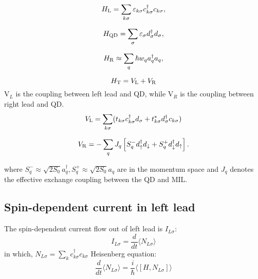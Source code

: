 \documentclass[11pt,a4paper]{book}
\begin{document}
\begin{equation}
H_{\rm{L}} = \sum_{k\sigma} \varepsilon_{k\sigma} c_{k \sigma}^{\dagger} c_{k \sigma},
\end{equation}

\begin{equation}
H_{\rm{QD}} = \sum_{\sigma}\varepsilon_{\sigma} d_{\sigma}^{\dagger} d_{\sigma},
\end{equation}

\begin{equation}
H_{\rm{R}} \approx \sum_{q} \hbar w_{q} a_{q}^{\dagger} a_{q},
\end{equation}

\begin{equation}
H_{\rm{T}} = V_{\rm{L}} + V_{\rm{R}}
\end{equation}
V$_{L}$ is the coupling between left lead and QD, while V$_{R}$ is the coupling between right lead and QD.
\begin{equation}
V_{\rm{L}} = \sum_{k\sigma}( t_{k\sigma} c_{k \sigma}^{\dagger} d_{\sigma} + t_{k\sigma}^{*} d_{\sigma}^{\dagger} c_{k\sigma})
\end{equation}

\begin{equation}
V_{\rm{R}}=-\sum_{q} J_{q}\left[S_{q}^{-} d_{\uparrow}^{\dagger} d_{\downarrow}+S_{q}^{+} d_{\downarrow}^{\dagger} d_{\uparrow}\right].
\end{equation}

where $S_{q}^{-} \approx \sqrt{2 S_{0}} a_{q}^{\dagger}, S_{q}^{+} \approx \sqrt{2 S_{0}} a_{q}$ are in the momentum space and $J_{q}$ denotes the effective exchange coupling between the QD and MIL.
\subsection{Spin-dependent current in left lead}
The spin-dependent current flow out of left lead is $I_{L\sigma}$:
\begin{equation}
I_{L\sigma} = \frac{d}{dt} \langle N_{L\sigma} \rangle
\end{equation}
in which, $N_{L\sigma} = \sum_{k} c_{k\sigma}^{\dag}c_{k\sigma}$
Heisenberg equation:
\begin{equation}
\frac{d}{dt} \langle N_{L\sigma} \rangle = \frac{i}{\hbar} \langle [H, N_{L\sigma}]\rangle
\end{equation}
\end{document}
